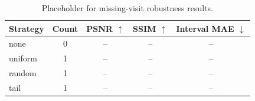 \begin{table}[ht]
\centering
\caption{Placeholder for missing-visit robustness results.}
\begin{tabular}{lcccc}
\toprule
Strategy & Count & PSNR $\uparrow$ & SSIM $\uparrow$ & Interval MAE $\downarrow$ \\
\midrule
none & 0 & -- & -- & -- \\
uniform & 1 & -- & -- & -- \\
random & 1 & -- & -- & -- \\
tail & 1 & -- & -- & -- \\
\bottomrule
\end{tabular}
\end{table}
